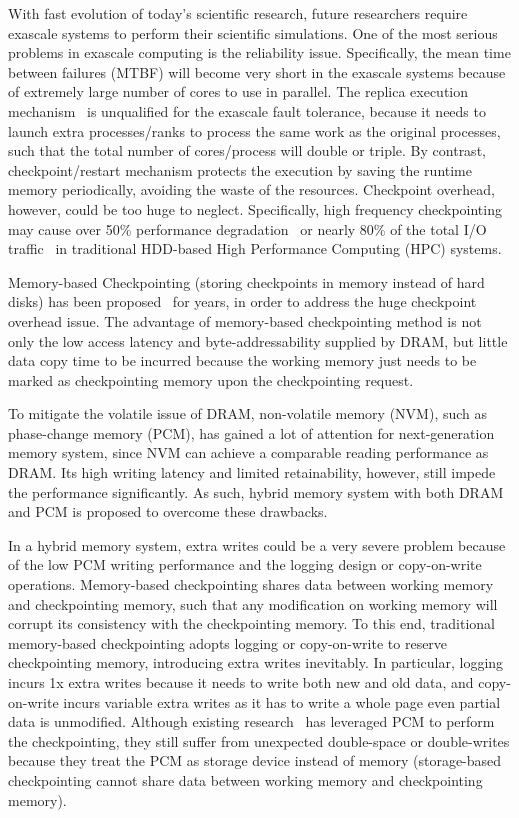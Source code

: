 \documentclass[conference]{IEEEtran}
\begin{document}
With fast evolution of today's scientific research, future researchers require exascale systems to perform their scientific simulations.
One of the most serious problems in exascale computing is the reliability issue.
Specifically, the mean time between failures (MTBF) will become very short in the exascale systems because of extremely large number of cores to use in parallel.
The replica execution mechanism~\cite{detection-sc12,Benson-SED,cite:scalable-rep,cite:scal-rep2} is unqualified for the exascale fault tolerance, because it needs to launch extra processes/ranks to process the same work as the original processes, such that the total number of cores/process will double or triple.
By contrast, checkpoint/restart mechanism protects the execution by saving the runtime memory periodically, avoiding the waste of the resources.
Checkpoint overhead, however, could be too huge to neglect.
Specifically, high frequency checkpointing may cause over 50\% performance degradation~\cite{stearley_rmpi_2011} or nearly 80\% of the total I/O traffic~\cite{petrini_scaling_2002} in traditional HDD-based High Performance Computing (HPC) systems.

Memory-based Checkpointing (storing checkpoints in memory instead of hard disks) has been proposed~\cite{sorin_safetynet_2002, prvulovic_revive_2002} for years, in order to address the huge checkpoint overhead issue.
The advantage of memory-based checkpointing method is not only the low access latency and byte-addressability supplied by DRAM, but little data copy time to be incurred because the working memory just needs to be marked as checkpointing memory upon the checkpointing request.

To mitigate the volatile issue of DRAM, non-volatile memory (NVM), such as phase-change memory (PCM), has gained a lot of attention for next-generation memory system, since NVM can achieve a comparable reading performance as DRAM\@.
Its high writing latency and limited retainability, however, still impede the performance significantly.
As such, hybrid memory system with both DRAM and PCM is proposed to overcome these drawbacks.

In a hybrid memory system, extra writes could be a very severe problem because of the low PCM writing performance and the logging design or copy-on-write operations.
Memory-based checkpointing shares data between working memory and checkpointing memory, such that any modification on working memory will corrupt its consistency with the checkpointing memory.
To this end, traditional memory-based checkpointing adopts logging or copy-on-write to reserve checkpointing memory, introducing extra writes inevitably.
In particular, logging incurs 1x extra writes because it needs to write both new and old data, and copy-on-write incurs variable extra writes as it has to write a whole page even partial data is unmodified.
Although existing research~\cite{dong_leveraging_2009, kannan_optimizing_2013, gao_real-time_2015} has leveraged PCM to perform the checkpointing, they still suffer from unexpected double-space or double-writes because they treat the PCM as storage device instead of memory (storage-based checkpointing cannot share data between working memory and checkpointing memory).
\end{document}
